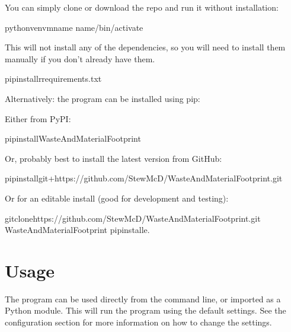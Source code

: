 \documentclass[letterpaper,10pt,english]{sphinxmanual}
\begin{document}
\sphinxAtStartPar
You can simply clone or download the repo and run it without installation:

\begin{sphinxVerbatim}[commandchars=\\\{\}]
pythonvenv\PYGZhy{}m\PYGZlt{}name\PYGZgt{}
\PYGZlt{}name\PYGZgt{}/bin/activate
\end{sphinxVerbatim}

\sphinxAtStartPar
This will not install any of the dependencies, so you will need to install them manually if you don’t already have them.

\begin{sphinxVerbatim}[commandchars=\\\{\}]
pipinstall\PYGZhy{}rrequirements.txt
\end{sphinxVerbatim}

\sphinxAtStartPar
Alternatively: the program can be installed using pip:

\sphinxAtStartPar
Either from PyPI:

\begin{sphinxVerbatim}[commandchars=\\\{\}]
pipinstallWasteAndMaterialFootprint
\end{sphinxVerbatim}

\sphinxAtStartPar
Or, probably best to install the latest version from GitHub:

\begin{sphinxVerbatim}[commandchars=\\\{\}]
pipinstallgit+https://github.com/Stew\PYGZhy{}McD/WasteAndMaterialFootprint.git
\end{sphinxVerbatim}

\sphinxAtStartPar
Or for an editable install (good for development and testing):

\begin{sphinxVerbatim}[commandchars=\\\{\}]
gitclonehttps://github.com/Stew\PYGZhy{}McD/WasteAndMaterialFootprint.git
WasteAndMaterialFootprint
pipinstall\PYGZhy{}e.
\end{sphinxVerbatim}

\sphinxstepscope


\chapter{Usage}
\label{\detokenize{usage:usage}}\label{\detokenize{usage::doc}}
\sphinxAtStartPar
The program can be used directly from the command line, or imported as a Python module. This will run the program using the default settings. See the configuration section for more information on how to change the settings.
\end{document}
